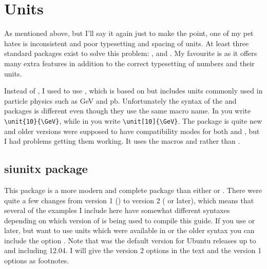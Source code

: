 \section{Units}
\label{sec:tips:units}

As mentioned above, but I'll say it again just to make the point,
one of my pet hates is inconsistent and poor typesetting and spacing
of units. At least three standard packages exist to solve this
problem: ,  and . My
favourite is  as it offers many extra features in
addition to the correct typesetting of numbers and their units.

Instead of , I used to use , which
is based on  but includes units commonly used in
particle physics such as \si{\GeV} and \si{\pico\barn}. Unfortunately
the syntax of the  and  packages is
different even though they use the same macro name. In
 you write \verb+\unit{10}{\GeV}+, while in
 you write \verb+\unit[10]{\GeV}+. The
 package is quite new and older versions were
supposed to have compatibility modes for both  and
, but I had problems getting them working. It uses the
macros  and  rather than .


\subsection{siunitx package}
\label{sec:tips:siunitx}

This package is a more modern and complete package than either
 or .
There were quite a few changes from version 1
() to version 2 ( or later), which means that several of the
examples I include here have somewhat different syntaxes depending on
which version of \TeXLive is being used to compile this guide. If you
use  or later, but want to use units which were available in
 or the older syntax you can include the option
. Note that  was the
default version for Ubuntu releases up to and including
12.04.
I will give the  version
2 options in the text and the version 1 options as footnotes.

